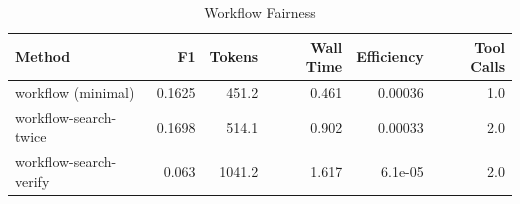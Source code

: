 \begin{table}[t]
\centering
\small
\caption{Workflow Fairness}
\begin{tabular}{lrrrrr}
\hline
Method & F1 & Tokens & Wall Time & Efficiency & Tool Calls \\
\hline
workflow (minimal) & 0.1625 & 451.2 & 0.461 & 0.00036 & 1.0 \\
workflow-search-twice & 0.1698 & 514.1 & 0.902 & 0.00033 & 2.0 \\
workflow-search-verify & 0.063 & 1041.2 & 1.617 & 6.1e-05 & 2.0 \\
\hline
\end{tabular}
\end{table}
